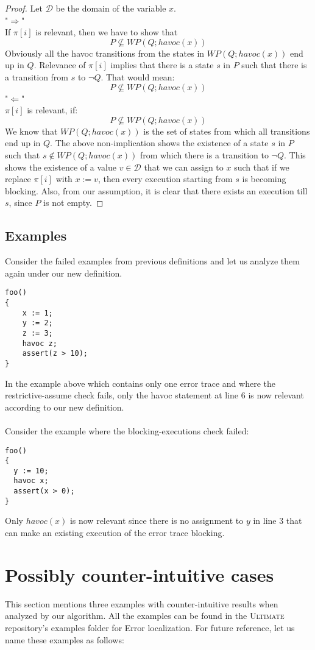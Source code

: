 \documentclass{article}
\newcommand{\ultimate}{\textsc{Ultimate}\xspace} %
\begin{document}
\begin{proof}
Let $\mathcal{D}$ be the domain of the variable $x$. \\
"$\Rightarrow$"\\
If $\pi[i]$ is relevant, then we have to show that\\
$$P \not \subseteq WP(Q;havoc(x))$$
Obviously all the havoc transitions from the states in $WP(Q;havoc(x))$ end up in $Q$. Relevance of $\pi[i]$ implies that there is a state $s$ in $P$ such that there is a transition from $s$ to $\neg Q$. That would mean:
$$P \not \subseteq WP(Q;havoc(x))$$
"$\Leftarrow$"\\
$\pi[i]$ is relevant, if:
$$P \not \subseteq WP(Q;havoc(x))$$
We know that $WP(Q;havoc(x))$ is the set of states from which all transitions end up in $Q$. The above non-implication shows the existence of a state $s$ in $P$ such that $s \not \in WP(Q; havoc(x))$  from which there is a transition to $\neg Q$. This shows the existence of a value $v \in \mathcal{D}$ that we can assign to $x$ such that if we replace $\pi[i]$ with $x:=v$, then every execution starting from $s$ is becoming blocking. Also, from our assumption, it is clear that there exists an execution till $s$, since $P$ is not empty.
\end{proof}
\subsection{Examples}
Consider the failed examples from previous definitions and let us analyze them again under our new definition.
\begin{lstlisting}
foo()
{
	x := 1;
	y := 2;
	z := 3;
	havoc z;
	assert(z > 10);
}
\end{lstlisting}
In the example above which contains only one error trace and where the restrictive-assume check fails, only the havoc statement at line 6 is now relevant according to our new definition. \\
\\
Consider the example where the blocking-executions check failed:
\begin{lstlisting}
foo()
{
  y := 10;
  havoc x;
  assert(x > 0);
}
\end{lstlisting}
Only $havoc(x)$ is now relevant since there is no assignment to $y$ in line 3 that can make an existing execution of the error trace blocking.


\section{Possibly counter-intuitive cases}
This section mentions three examples with  counter-intuitive results when analyzed by our algorithm. All the examples can be found in the \ultimate repository's examples folder for Error localization. For future reference, let us name these examples as follows:
\end{document}
